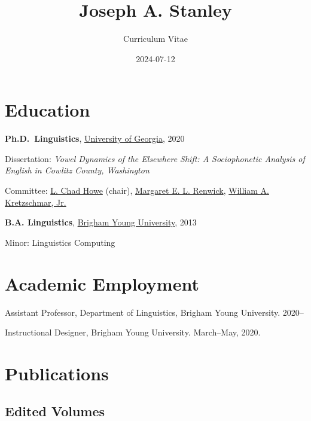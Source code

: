 \documentclass[
]{article}
\title{Joseph A. Stanley}
\subtitle{Curriculum Vitae}
\author{}
\date{2024-07-12}
\begin{document}
\maketitle
\ifdefined\Shaded\renewenvironment{Shaded}{\begin{tcolorbox}[frame hidden, interior hidden, boxrule=0pt, borderline west={3pt}{0pt}{shadecolor}, enhanced, breakable, sharp corners]}{\end{tcolorbox}}\fi

\hypertarget{education}{%
\section{Education}\label{education}}

\textbf{Ph.D.~Linguistics},
\href{http://www.linguistics.uga.edu/}{University of Georgia}, 2020

Dissertation: \emph{Vowel Dynamics of the Elsewhere Shift: A
Sociophonetic Analysis of English in Cowlitz County, Washington}

Committee: \href{https://chadhoweuga.github.io}{L. Chad Howe} (chair),
\href{https://linguistics.uga.edu/directory/people/margaret-e-l-renwick/}{Margaret
E. L. Renwick},
\href{https://www.english.uga.edu/directory/people/william-kretzschmar}{William
A. Kretzschmar, Jr.}

\textbf{B.A. Linguistics}, \href{http://ling.byu.edu/}{Brigham Young
University}, 2013

Minor: Linguistics Computing

\hypertarget{academic-employment}{%
\section{Academic Employment}\label{academic-employment}}

Assistant Professor, Department of Linguistics, Brigham Young
University. 2020--

Instructional Designer, Brigham Young University. March--May, 2020.

\hypertarget{publications}{%
\section{Publications}\label{publications}}

\hypertarget{edited-volumes}{%
\subsection{Edited Volumes}\label{edited-volumes}}
\end{document}
